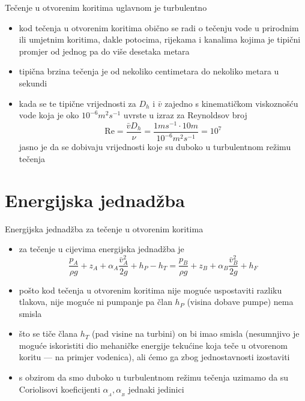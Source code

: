 \documentclass{beamer}
\begin{document}
\begin{frame}{Tečenje u otvorenim koritima uglavnom je turbulentno}

\begin{itemize}
\item kod tečenja u otvorenim koritima obično se radi o tečenju vode u prirodnim
ili umjetnim koritima, dakle potocima, rijekama i kanalima kojima
je tipični promjer od jednog pa do više desetaka metara
\item tipična brzina tečenja je od nekoliko centimetara do nekoliko metara
u sekundi
\item kada se te tipične vrijednosti za $D_{h}$ i $\bar{v}$ zajedno s
kinematičkom viskoznošću vode koja je oko $10^{-6}m^{2}s^{-1}$ uvrste
u izraz za Reynoldsov broj
\[
\mathrm{Re}=\frac{\bar{v}D_{h}}{\nu}=\frac{1ms^{-1}\cdot10m}{10^{-6}m^{2}s^{-1}}=10^{7}
\]
jasno je da se dobivaju vrijednosti koje su duboko u turbulentnom
režimu tečenja
\end{itemize}
\end{frame}

\section{Energijska jednadžba}
\begin{frame}{Energijska jednadžba za tečenje u otvorenim koritima}

\begin{itemize}
\item za tečenje u cijevima energijska jednadžba je
\[
\frac{p_{{\scriptscriptstyle A}}}{\rho g}+z_{{\scriptscriptstyle A}}+\alpha_{{\scriptscriptstyle A}}\frac{\bar{v}_{{\scriptscriptstyle A}}^{2}}{2g}+h_{P}-h_{T}=\frac{p_{{\scriptscriptstyle B}}}{\rho g}+z_{{\scriptscriptstyle B}}+\alpha_{{\scriptscriptstyle B}}\frac{\bar{v}_{{\scriptscriptstyle B}}^{2}}{2g}+h_{F}
\]
\item pošto kod tečenja u otvorenim koritima nije moguće uspostaviti razliku
tlakova, nije moguće ni pumpanje pa član $h_{P}$ (visina dobave pumpe)
nema smisla
\item što se tiče člana $h_{T}$ (pad visine na turbini) on bi imao smisla
(nesumnjivo je moguće iskoristiti dio mehaničke energije tekućine
koja teče u otvorenom koritu --- na primjer vodenica), ali ćemo ga
zbog jednostavnosti izostaviti
\item s obzirom da smo duboko u turbulentnom režimu tečenja uzimamo da su
Coriolisovi koeficijenti $\alpha_{_{A}},\alpha_{_{B}}$ jednaki jedinici 
\end{itemize}
\end{frame}
\end{document}
